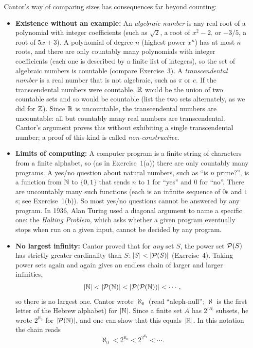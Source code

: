 Cantor's way of comparing sizes has consequences far beyond counting:
\begin{itemize}
\item \textbf{Existence without an example:} An \emph{algebraic number} is any real root of a polynomial with integer coefficients (such as $\sqrt{2}$, a root of $x^2 - 2$, or $-3/5$, a root of $5x + 3$). A polynomial of degree $n$ (highest power $x^n$) has at most $n$ roots, and there are only countably many polynomials with integer coefficients (each one is described by a finite list of integers), so the set of algebraic numbers is countable (compare Exercise~3). A \emph{transcendental number} is a real number that is not algebraic, such as $\pi$ or $e$. If the transcendental numbers were countable, $\mathbb{R}$ would be the union of two countable sets and so would be countable (list the two sets alternately, as we did for $\mathbb{Z}$). Since $\mathbb{R}$ is uncountable, the transcendental numbers are uncountable: all but countably many real numbers are transcendental. Cantor's argument proves this without exhibiting a single transcendental number; a proof of this kind is called \emph{non-constructive}.
\item \textbf{Limits of computing:} A computer program is a finite string of characters from a finite alphabet, so (as in Exercise~1(a)) there are only countably many programs. A yes/no question about natural numbers, such as ``is $n$ prime?'', is a function from $\mathbb{N}$ to $\{0, 1\}$ that sends $n$ to $1$ for ``yes'' and $0$ for ``no''. There are uncountably many such functions (each is an infinite sequence of $0$s and $1$s; see Exercise~1(b)). So most yes/no questions cannot be answered by any program. In 1936, Alan Turing used a diagonal argument to name a specific one: the \emph{Halting Problem}, which asks whether a given program eventually stops when run on a given input, cannot be decided by any program.
\item \textbf{No largest infinity:} Cantor proved that for \emph{any} set $S$, the power set $\mathcal{P}(S)$ has strictly greater cardinality than $S$: $|S| < |\mathcal{P}(S)|$ (Exercise~4). Taking power sets again and again gives an endless chain of larger and larger infinities,
\[
|\mathbb{N}| < |\mathcal{P}(\mathbb{N})| < |\mathcal{P}(\mathcal{P}(\mathbb{N}))| < \cdots,
\]
so there is no largest one. Cantor wrote $\aleph_0$ (read ``aleph-null''; $\aleph$ is the first letter of the Hebrew alphabet) for $|\mathbb{N}|$. Since a finite set $A$ has $2^{|A|}$ subsets, he wrote $2^{\aleph_0}$ for $|\mathcal{P}(\mathbb{N})|$, and one can show that this equals $|\mathbb{R}|$. In this notation the chain reads
\[
\aleph_0 < 2^{\aleph_0} < 2^{2^{\aleph_0}} < \cdots.
\]
\end{itemize}

